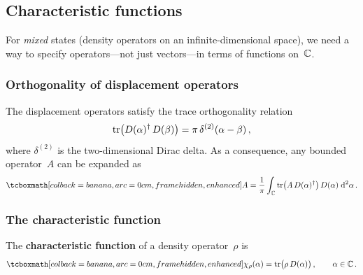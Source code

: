 \subsection{Characteristic functions}\label{sec:characteristic}

For \emph{mixed} states (density operators on an infinite-dimensional
space), we need a way to specify operators---not just vectors---in
terms of functions on~$\mathbb{C}$.

\subsubsection{Orthogonality of displacement operators}

The displacement operators satisfy the trace orthogonality relation
\begin{equation}\label{eq:displacement-orthogonality}
  \operatorname{tr}\bigl(D(\alpha)^\dagger\, D(\beta)\bigr)
  = \pi\,\delta^{(2)}(\alpha - \beta)\,,
\end{equation}
where $\delta^{(2)}$ is the two-dimensional Dirac delta.  As a
consequence, any bounded operator~$A$ can be expanded as
\begin{equation}\label{eq:operator-expansion}
  \eqbox{A = \frac{1}{\pi}\int_{\C}
    \tr\bigl(A\, D(\alpha)^\adj\bigr)\, D(\alpha)\;\dd^2\alpha}\,.
\end{equation}

\subsubsection{The characteristic function}

\begin{definition}\label{def:char-fn}
  The \textbf{characteristic function} of a density operator~$\rho$ is
  \begin{equation}\label{eq:char-fn}
    \eqbox{\chi_\rho(\alpha) = \tr\bigl(\rho\, D(\alpha)\bigr)}\,,
    \qquad \alpha \in \C\,.
  \end{equation}
\end{definition}

